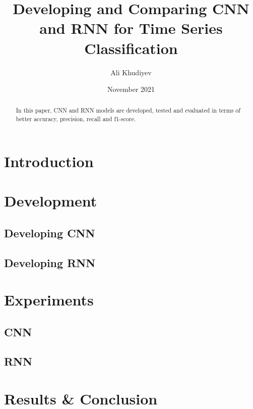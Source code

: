 \documentclass[a4paper]{article}
\title{Developing and Comparing CNN and RNN for Time Series Classification}
\author{Ali Khudiyev}
\date{November 2021}
\begin{document}
\maketitle

\begin{abstract}
	In this paper, CNN and RNN models are developed, tested and evaluated in terms of better accuracy, precision, recall and f1-score.
\end{abstract}

\section{Introduction}


\section{Development}
\subsection{Developing CNN}

\subsection{Developing RNN}

\section{Experiments}
\subsection{CNN}
\subsection{RNN}

\section{Results \& Conclusion}
\end{document}
